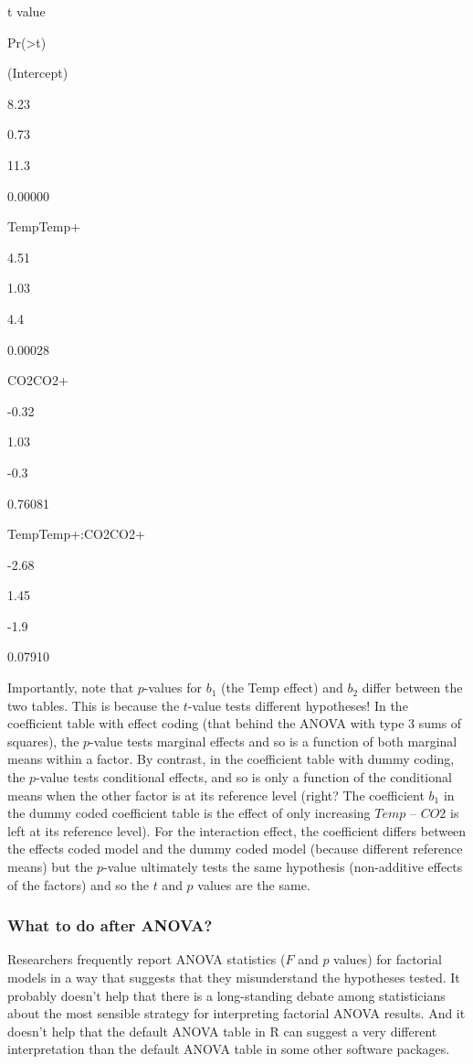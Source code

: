 \documentclass[]{book}
\begin{document}
t value

Pr(\textgreater{}\textbar{}t\textbar{})

(Intercept)

8.23

0.73

11.3

0.00000

TempTemp+

4.51

1.03

4.4

0.00028

CO2CO2+

-0.32

1.03

-0.3

0.76081

TempTemp+:CO2CO2+

-2.68

1.45

-1.9

0.07910

Importantly, note that \(p\)-values for \(b_1\) (the Temp effect) and
\(b_2\) differ between the two tables. This is because the \(t\)-value
tests different hypotheses! In the coefficient table with effect coding
(that behind the ANOVA with type 3 sums of squares), the \(p\)-value
tests marginal effects and so is a function of both marginal means
within a factor. By contrast, in the coefficient table with dummy
coding, the \(p\)-value tests conditional effects, and so is only a
function of the conditional means when the other factor is at its
reference level (right? The coefficient \(b_1\) in the dummy coded
coefficient table is the effect of only increasing \(Temp\) -- \(CO2\)
is left at its reference level). For the interaction effect, the
coefficient differs between the effects coded model and the dummy coded
model (because different reference means) but the \(p\)-value ultimately
tests the same hypothesis (non-additive effects of the factors) and so
the \(t\) and \(p\) values are the same.

\subsubsection{What to do after ANOVA?}\label{what-to-do-after-anova}

Researchers frequently report ANOVA statistics (\(F\) and \(p\) values)
for factorial models in a way that suggests that they misunderstand the
hypotheses tested. It probably doesn't help that there is a
long-standing debate among statisticians about the most sensible
strategy for interpreting factorial ANOVA results. And it doesn't help
that the default ANOVA table in R can suggest a very different
interpretation than the default ANOVA table in some other software
packages.
\end{document}
